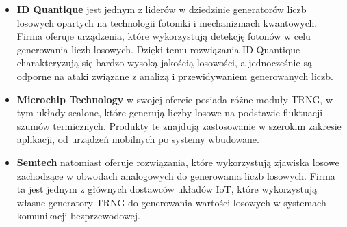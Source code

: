 \begin{itemize}
    \item \textbf{ID Quantique} jest jednym z liderów w dziedzinie generatorów liczb losowych opartych na technologii fotoniki i mechanizmach kwantowych.
     Firma oferuje urządzenia, które wykorzystują detekcję fotonów w celu generowania liczb losowych.
     Dzięki temu rozwiązania ID Quantique charakteryzują się bardzo wysoką jakością losowości,
     a jednocześnie są odporne na ataki związane z analizą i przewidywaniem generowanych liczb.

    \item \textbf{Microchip Technology} w swojej ofercie posiada różne moduły TRNG, w tym układy scalone,
     które generują liczby losowe na podstawie fluktuacji szumów termicznych.
    Produkty te znajdują zastosowanie w szerokim zakresie aplikacji, od urządzeń mobilnych po systemy wbudowane.

    \item \textbf{Semtech} natomiast oferuje rozwiązania, które wykorzystują zjawiska losowe
     zachodzące w obwodach analogowych do generowania liczb losowych.
     Firma ta jest jednym z głównych dostawców układów IoT, które wykorzystują własne generatory TRNG
     do generowania wartości losowych w systemach komunikacji bezprzewodowej.
\end{itemize}


